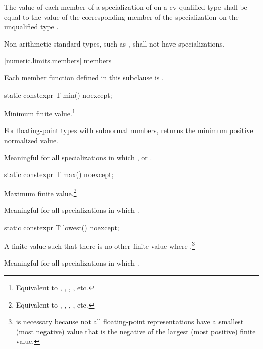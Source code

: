 \pnum
The value of each member of a specialization of
 on a cv-qualified type
 shall be equal to the value of the corresponding member of
the specialization on the unqualified type .

\pnum
Non-arithmetic standard types, such as
, shall not have specializations.

[numeric.limits.members]{ members}

\pnum
{}%
Each member function defined in this subclause is .

%
\begin{itemdecl}
static constexpr T min() noexcept;
\end{itemdecl}

\begin{itemdescr}
\pnum
Minimum finite value.\footnote{Equivalent to , ,
, , etc.}

%
\pnum
For floating-point types with subnormal numbers, returns the minimum positive
normalized value.

\pnum
Meaningful for all specializations in which
,
or
.
\end{itemdescr}

\begin{indexed}{}
\begin{itemdecl}
static constexpr T max() noexcept;
\end{itemdecl}
\end{indexed}

\begin{itemdescr}
\pnum
Maximum finite value.\footnote{Equivalent to , ,
, , etc.}

\pnum
Meaningful for all specializations in which
.
\end{itemdescr}

%
\begin{itemdecl}
static constexpr T lowest() noexcept;
\end{itemdecl}

\begin{itemdescr}
\pnum
A finite value  such that there is no other finite
value  where .\footnote{ is necessary because not all
floating-point representations have a smallest (most negative) value that is
the negative of the largest (most positive) finite value.}

\pnum
Meaningful for all specializations in which .
\end{itemdescr}

